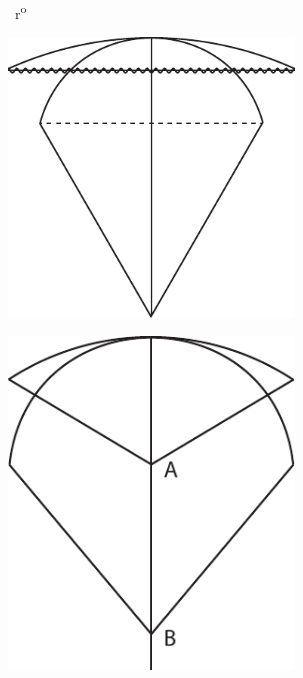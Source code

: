 \vspace{5mm}
\pstart
\noindent{}~r\textsuperscript{o}\rbrack
\pend
\pstart
\noindent
\begin{minipage}[c]{0.5\textwidth}
\hspace*{10mm}
\includegraphics[width=0.57\textwidth]{images/LH035,02,01_273-d1.pdf}
\end{minipage}
\hspace*{17,3mm}
\begin{minipage}[c]{0.5\textwidth}
\includegraphics[width=0.57\textwidth]{images/LH035,02,01_273-d2.pdf}
\end{minipage}
\pend
\vspace{2mm}
\pstart
\noindent
